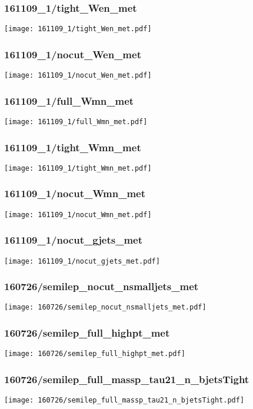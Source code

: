 \begin{frame}
   \frametitle{\small 161109\_1/tight\_Wen\_met}
   \centering
   \texttt{[image: 161109\_1/tight\_Wen\_met.pdf]}
\end{frame}

\begin{frame}
   \frametitle{\small 161109\_1/nocut\_Wen\_met}
   \centering
   \texttt{[image: 161109\_1/nocut\_Wen\_met.pdf]}
\end{frame}

\begin{frame}
   \frametitle{\small 161109\_1/full\_Wmn\_met}
   \centering
   \texttt{[image: 161109\_1/full\_Wmn\_met.pdf]}
\end{frame}

\begin{frame}
   \frametitle{\small 161109\_1/tight\_Wmn\_met}
   \centering
   \texttt{[image: 161109\_1/tight\_Wmn\_met.pdf]}
\end{frame}

\begin{frame}
   \frametitle{\small 161109\_1/nocut\_Wmn\_met}
   \centering
   \texttt{[image: 161109\_1/nocut\_Wmn\_met.pdf]}
\end{frame}

\begin{frame}
   \frametitle{\small 161109\_1/nocut\_gjets\_met}
   \centering
   \texttt{[image: 161109\_1/nocut\_gjets\_met.pdf]}
\end{frame}

\begin{frame}
   \frametitle{\small 160726/semilep\_nocut\_nsmalljets\_met}
   \centering
   \texttt{[image: 160726/semilep\_nocut\_nsmalljets\_met.pdf]}
\end{frame}

\begin{frame}
   \frametitle{\small 160726/semilep\_full\_highpt\_met}
   \centering
   \texttt{[image: 160726/semilep\_full\_highpt\_met.pdf]}
\end{frame}

\begin{frame}
   \frametitle{\small 160726/semilep\_full\_massp\_tau21\_n\_bjetsTight}
   \centering
   \texttt{[image: 160726/semilep\_full\_massp\_tau21\_n\_bjetsTight.pdf]}
\end{frame}

